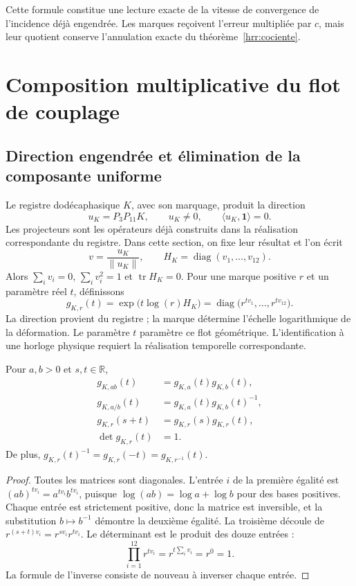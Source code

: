 Cette formule constitue une lecture exacte de la vitesse de convergence de l’incidence déjà engendrée. Les marques reçoivent l’erreur multipliée par \(c\), mais leur quotient conserve l’annulation exacte du théorème~\ref{hrr:cociente}.

\section{Composition multiplicative du flot de couplage}
\label{hrr:flujo}

\subsection{Direction engendrée et élimination de la composante uniforme}

Le registre dodécaphasique \(K\), avec son marquage, produit la direction
\[
 u_K=P_3P_{11}K,\qquad u_K\neq0,\qquad
 \langle u_K,\mathbf1\rangle=0.
\]
Les projecteurs sont les opérateurs déjà construits dans la réalisation correspondante du registre. Dans cette section, on fixe leur résultat et l’on écrit
\[
 v=\frac{u_K}{\|u_K\|},\qquad
 H_K=\operatorname{diag}(v_1,\ldots,v_{12}).
\]
Alors \(\sum_i v_i=0\), \(\sum_i v_i^2=1\) et \(\operatorname{tr}H_K=0\). Pour une marque positive \(r\) et un paramètre réel \(t\), définissons
\begin{equation}
 g_{K,r}(t)=\exp\bigl(t\log(r)H_K\bigr)
 =\operatorname{diag}\bigl(r^{tv_1},\ldots,r^{tv_{12}}\bigr).
 \label{hrr:g-definicion}
\end{equation}
La direction provient du registre ; la marque détermine l’échelle logarithmique de la déformation. Le paramètre \(t\) paramètre ce flot géométrique. L’identification à une horloge physique requiert la réalisation temporelle correspondante.

\begin{theorem}
\label{hrr:homomorfismo} Pour \(a,b>0\) et \(s,t\in\mathbb R\),
\begin{align}
 g_{K,ab}(t)&=g_{K,a}(t)g_{K,b}(t),
 \label{hrr:producto}\\
 g_{K,a/b}(t)&=g_{K,a}(t)g_{K,b}(t)^{-1},
 \label{hrr:cociente-flujo}\\
 g_{K,r}(s+t)&=g_{K,r}(s)g_{K,r}(t),
 \label{hrr:grupo-t}\\
 \det g_{K,r}(t)&=1.
 \label{hrr:determinante}
\end{align}
De plus, \(g_{K,r}(t)^{-1}=g_{K,r}(-t)=g_{K,r^{-1}}(t)\).
\end{theorem}
\begin{proof}
Toutes les matrices sont diagonales. L’entrée \(i\) de la première égalité est \((ab)^{tv_i}=a^{tv_i}b^{tv_i}\), puisque \(\log(ab)=\log a+\log b\) pour des bases positives. Chaque entrée est strictement positive, donc la matrice est inversible, et la substitution \(b\mapsto b^{-1}\) démontre la deuxième égalité. La troisième découle de \(r^{(s+t)v_i}=r^{sv_i}r^{tv_i}\). Le déterminant est le produit des douze entrées :
\[
 \prod_{i=1}^{12}r^{tv_i}
 =r^{t\sum_i v_i}=r^0=1.
\]
La formule de l’inverse consiste de nouveau à inverser chaque entrée.
\end{proof}

